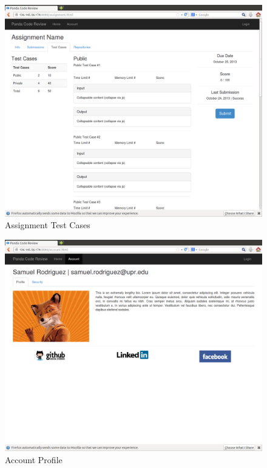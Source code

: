\begin{figure}[H]
	\centering
	\includegraphics[width=\textwidth]{img/assignment-test}
	\caption{Assignment Test Cases}
\end{figure}


\begin{figure}[H]
	\centering
	\includegraphics[width=\textwidth]{img/account-profile}
	\caption{Account Profile}
\end{figure}

